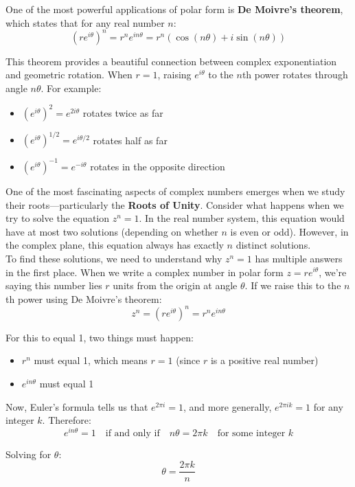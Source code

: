 \noindent One of the most powerful applications of polar form is \textbf{De Moivre's theorem}, which states that for any real number $n$:
\[
(re^{i\theta})^n = r^n e^{in\theta} = r^n(\cos(n\theta) + i\sin(n\theta))
\]

\noindent This theorem provides a beautiful connection between complex exponentiation and geometric rotation. When $r=1$, raising $e^{i\theta}$ to the $n$th power rotates through angle $n\theta$. For example:
\begin{itemize}
   \item $(e^{i\theta})^2 = e^{2i\theta}$ rotates twice as far
   \item $(e^{i\theta})^{1/2} = e^{i\theta/2}$ rotates half as far
   \item $(e^{i\theta})^{-1} = e^{-i\theta}$ rotates in the opposite direction
\end{itemize}

\noindent One of the most fascinating aspects of complex numbers emerges when we study their roots—particularly the \textbf{Roots of Unity}. Consider what happens when we try to solve the equation $z^n = 1$. In the real number system, this equation would have at most two solutions (depending on whether $n$ is even or odd). However, in the complex plane, this equation always has exactly $n$ distinct solutions. \\

\noindent To find these solutions, we need to understand why $z^n = 1$ has multiple answers in the first place. When we write a complex number in polar form $z = re^{i\theta}$, we're saying this number lies $r$ units from the origin at angle $\theta$. If we raise this to the $n$th power using De Moivre's theorem:
\[
z^n = (re^{i\theta})^n = r^ne^{in\theta}
\]

\noindent For this to equal 1, two things must happen:
\begin{itemize}
    \item $r^n$ must equal 1, which means $r = 1$ (since $r$ is a positive real number)
    \item $e^{in\theta}$ must equal 1
\end{itemize}

\noindent Now, Euler's formula tells us that $e^{2\pi i} = 1$, and more generally, $e^{2\pi i k} = 1$ for any integer $k$. Therefore:
\[
e^{in\theta} = 1 \quad \text{if and only if} \quad n\theta = 2\pi k \quad \text{for some integer } k
\]

\noindent Solving for $\theta$:
\[
\theta = \frac{2\pi k}{n}
\]

